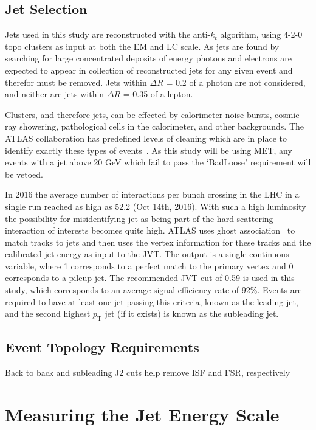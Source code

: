 \subsection{Jet Selection}
Jets used in this study are reconstructed with the anti-$k_t$ algorithm, using 4-2-0 topo clusters as input at both the EM and LC scale.  
As jets are found by searching for large concentrated deposits of energy photons and electrons are expected to appear in collection of reconstructed jets for any given event and therefor must be removed.  
Jets within $\Delta R$ = 0.2 of a photon are not considered, and neither are jets within $\Delta R$ = 0.35 of a lepton.  

Clusters, and therefore jets, can be effected by calorimeter noise bursts, cosmic ray showering, pathological cells in the calorimeter, and other backgrounds.  
The ATLAS collaboration has predefined levels of cleaning which are in place to identify exactly these types of events~\cite{ATLAS-CONF-2015-029}.  
As this study will be using MET, any events with a jet above 20 GeV which fail to pass the `BadLoose' requirement will be vetoed.  

In 2016 the average number of interactions per bunch crossing in the LHC in a single run reached as high as 52.2 (Oct 14th, 2016).  
With such a high luminosity the possibility for misidentifying jet as being part of the hard scattering interaction of interests becomes quite high.  
ATLAS uses ghost association~\cite{ATLAS-CONF-2013-083} to match tracks to jets and then uses the vertex information for these tracks and the calibrated jet energy as input to the \gls{JVT}\cite{ATLAS-CONF-2014-018}.  
The output is a single continuous variable, where 1 corresponds to a perfect match to the primary vertex and 0 corresponds to a pileup jet.  
The recommended JVT cut of 0.59 is used in this study, which corresponds to an average signal efficiency rate of 92\%.  
Events are required to have at least one jet passing this criteria, known as the leading jet, and the second highest $p_{\mathrm T}$ jet (if it exists) is known as the subleading jet.  


\subsection{Event Topology Requirements}
Back to back and subleading J2 cuts help remove ISF and FSR, respectively 


\section{Measuring the Jet Energy Scale}
\label{MeasureJES}

